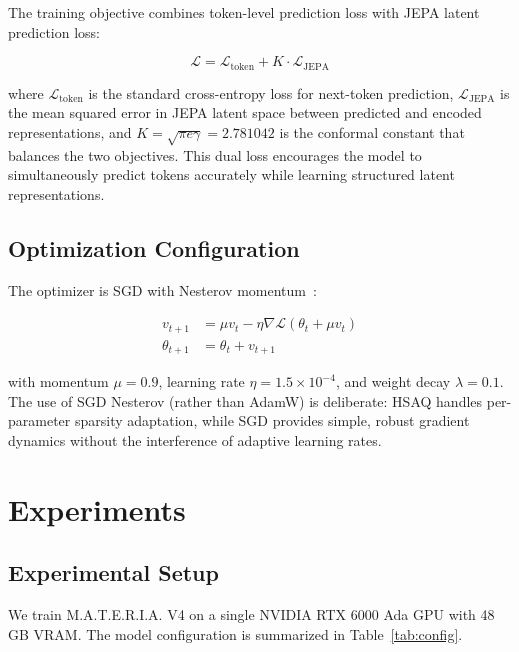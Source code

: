 \documentclass[conference]{IEEEtran}
\newcommand{\materia}{\textsc{M.A.T.E.R.I.A.}}
\begin{document}
The training objective combines token-level prediction loss with JEPA latent prediction loss:

\begin{equation}
\mathcal{L} = \mathcal{L}_{\text{token}} + K \cdot \mathcal{L}_{\text{JEPA}}
\end{equation}

where $\mathcal{L}_{\text{token}}$ is the standard cross-entropy loss for next-token prediction, $\mathcal{L}_{\text{JEPA}}$ is the mean squared error in JEPA latent space between predicted and encoded representations, and $K = \sqrt{\pi e \gamma} = 2.781042$ is the conformal constant that balances the two objectives. This dual loss encourages the model to simultaneously predict tokens accurately while learning structured latent representations.

\subsection{Optimization Configuration}

The optimizer is SGD with Nesterov momentum~\cite{sutskever2013importance}:

\begin{align}
v_{t+1} &= \mu v_t - \eta \nabla \mathcal{L}(\theta_t + \mu v_t) \\
\theta_{t+1} &= \theta_t + v_{t+1}
\end{align}

with momentum $\mu = 0.9$, learning rate $\eta = 1.5 \times 10^{-4}$, and weight decay $\lambda = 0.1$. The use of SGD Nesterov (rather than AdamW) is deliberate: HSAQ handles per-parameter sparsity adaptation, while SGD provides simple, robust gradient dynamics without the interference of adaptive learning rates.

\section{Experiments}

\subsection{Experimental Setup}

We train \materia{} V4 on a single NVIDIA RTX 6000 Ada GPU with 48 GB VRAM. The model configuration is summarized in Table~\ref{tab:config}.
\end{document}

